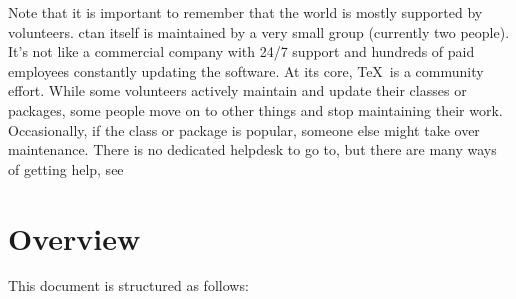 Note that it is important to remember that the  world is mostly
supported by volunteers. \gls{ctan} itself is maintained by a very small
group (currently two people). It's not like a commercial company
with 24/7 support and hundreds of paid employees constantly updating
the software. At its core, \TeX\ is a community effort. While some
volunteers actively maintain and update their classes or packages,
some people move on to other things and stop maintaining their work.
Occasionally, if the class or package is popular, someone else
might take over maintenance. There is no dedicated helpdesk to go
to, but there are many ways of getting help, see

\section{Overview}

This document is structured as follows:

